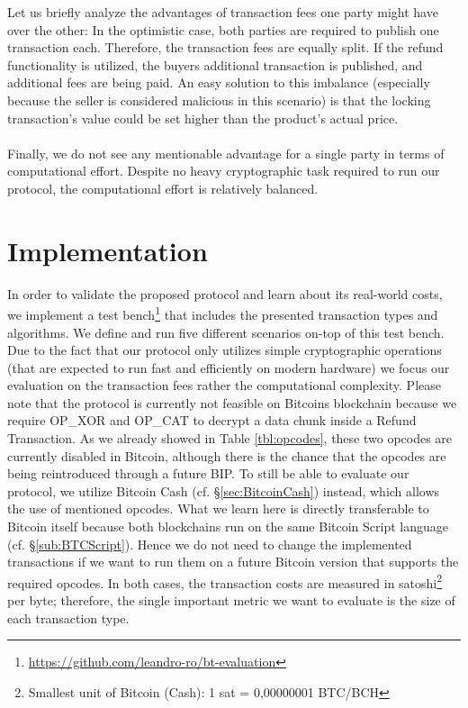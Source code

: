 \documentclass{cacthesis}
\newcounter{protocol}
\begin{document}
        Let us briefly analyze the advantages of transaction fees one party might have over the other: In the optimistic case, both parties are required to publish one transaction each. Therefore, the transaction fees are equally split. If the refund functionality is utilized, the buyers additional transaction is published, and additional fees are being paid. An easy solution to this imbalance (especially because the seller is considered malicious in this scenario) is that the locking transaction's value could be set higher than the product's actual price. \\\\
        Finally, we do not see any mentionable advantage for a single party in terms of computational effort. Despite no heavy cryptographic task required to run our protocol, the computational effort is relatively balanced. 
	    
	\chapter{Implementation}
	    In order to validate the proposed protocol and learn about its real-world costs, we implement a test bench\footnote{\url{https://github.com/leandro-ro/bt-evaluation}} that includes the presented transaction types and algorithms. We define and run five different scenarios on-top of this test bench. Due to the fact that our protocol only utilizes simple cryptographic operations (that are expected to run fast and efficiently on modern hardware) we focus our evaluation on the transaction fees rather the computational complexity. Please note that the protocol is currently not feasible on Bitcoins blockchain because we require OP\_XOR and OP\_CAT to decrypt a data chunk inside a Refund Transaction. As we already showed in Table \ref{tbl:opcodes}, these two opcodes are currently disabled in Bitcoin, although there is the chance that the opcodes are being reintroduced through a future BIP. To still be able to evaluate our protocol, we utilize Bitcoin Cash (cf. §\ref{sec:BitcoinCash}) instead, which allows the use of mentioned opcodes. What we learn here is directly transferable to Bitcoin itself because both blockchains run on the same Bitcoin Script language (cf. §\ref{sub:BTCScript}). Hence we do not need to change the implemented transactions if we want to run them on a future Bitcoin version that supports the required opcodes. In both cases, the transaction costs are measured in satoshi\footnote{Smallest unit of Bitcoin (Cash): 1 sat = 0,00000001 BTC/BCH} per byte; therefore, the single important metric we want to evaluate is the size of each transaction type.
	    
\end{document}
